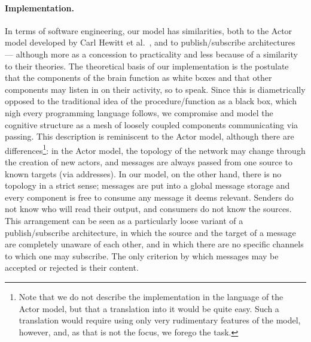 \paragraph{Implementation.} In terms of software engineering, our model has similarities, both to the Actor model developed by Carl Hewitt et al.\ \cite{hewittActor}, and to publish/subscribe architectures \cite{publishSubscribe} --- although more as a concession to practicality and less because of a similarity to their theories. The theoretical basis of our implementation is the postulate that the components of the brain function as white boxes and that other components may listen in on their activity, so to speak. Since this is diametrically opposed to the traditional idea of the procedure/function as a black box, which nigh every programming language follows, we compromise and model the cognitive structure as a mesh of loosely coupled components communicating via passing. This description is reminiscent to the Actor model, although there are differences\footnote{Note that we do not describe the implementation in the language of the Actor model, but that a translation into it would be quite easy. Such a translation would require using only very rudimentary features of the model, however, and, as that is not the focus, we forego the task.}: in the Actor model, the topology of the network may change through the creation of new actors, and messages are always passed from one source to known targets (via addresses). In our model, on the other hand, there is no topology in a strict sense; messages are put into a global message storage and every component is free to consume any message it deems relevant. Senders do not know who will read their output, and consumers do not know the sources. This arrangement can be seen as a particularly loose variant of a publish/subscribe architecture, in which the source and the target of a message are completely unaware of each other, and in which there are no specific channels to which one may subscribe. The only criterion by which messages may be accepted or rejected is their content.


